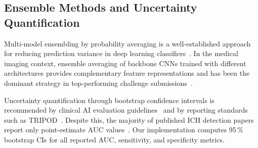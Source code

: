 \subsection{Ensemble Methods and Uncertainty Quantification}

Multi-model ensembling by probability averaging is a well-established
approach for reducing prediction variance in deep learning
classifiers~\cite{lakshminarayanan2017simple}.
In the medical imaging context, ensemble averaging of backbone CNNs trained
with different architectures provides complementary feature representations
and has been the dominant strategy in top-performing challenge
submissions~\cite{wang2021deeplearning,rsna2019}.

Uncertainty quantification through bootstrap confidence intervals is
recommended by clinical AI evaluation
guidelines~\cite{topol2019highperformance} and by reporting standards such
as TRIPOD~\cite{moons2015tripod}.
Despite this, the majority of published ICH detection papers report only
point-estimate AUC values~\cite{cho2021systematic}.
Our implementation computes 95\,\% bootstrap CIs for all reported AUC,
sensitivity, and specificity metrics.
